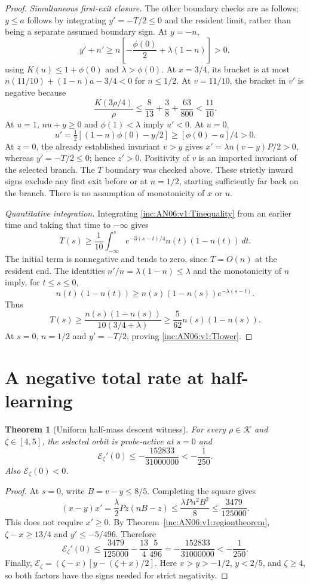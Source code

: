 \documentclass[11pt]{article}
\numberwithin{equation}{section}
\newtheorem{theorem}{Theorem}[section]
\theoremstyle{remark}\newtheorem{remark}[theorem]{Remark}
\newcommand{\1}{\mathbf 1}
\begin{document}
\begin{proof}
\emph{Simultaneous first-exit closure.}
The other boundary checks are as follows; $y\le a$ follows by integrating
$y'=-T/2\le0$ and the resident limit, rather than being a separate assumed
boundary sign.
At $y=-n$,
\[
 y'+n'\ge n\left[-\frac{\phi(0)}2+\lambda(1-n)\right]>0,
\]
using $K(u)\le1+\phi(0)$ and $\lambda>\phi(0)$.
At $x=3/4$, its bracket is at most
$n(11/10)+(1-n)a-3/4<0$ for $n\le1/2$.
At $v=11/10$, the bracket in $v'$ is negative because
\[
 \frac{K(3\rho/4)}\rho
 \le\frac{8}{13}+\frac38+\frac{63}{800}<\frac{11}{10}.
\]
At $u=1$, $nu+y\ge0$ and $\phi(1)<\lambda$ imply $u'<0$.
At $u=0$,
\[
 u'=\tfrac12[(1-n)\phi(0)-y/2]\ge[\phi(0)-a]/4>0.
\]
At $z=0$, the already established invariant $v>y$ gives
$x'=\lambda n(v-y)P/2>0$, whereas $y'=-T/2\le0$; hence $z'>0$.
Positivity of $v$ is an imported invariant of the selected branch.
The $T$ boundary was checked above. These strictly inward signs exclude
any first exit before or at $n=1/2$, starting sufficiently far back on the
branch. There is no assumption of monotonicity of $x$ or $u$.

\emph{Quantitative integration.}
Integrating \eqref{inc:AN06:v1:Tinequality} from an earlier time and taking
that time to $-\infty$ gives
\[
 T(s)\ge\frac1{10}\int_{-\infty}^s
 e^{-3(s-t)/4}n(t)(1-n(t))\,dt.
\]
The initial term is nonnegative and tends to zero, since $T=O(n)$ at the
resident end. The identities $n'/n=\lambda(1-n)\le\lambda$ and the
monotonicity of $n$ imply, for $t\le s\le0$,
\[
 n(t)(1-n(t))\ge n(s)(1-n(s))e^{-\lambda(s-t)}.
\]
Thus
\[
 T(s)\ge\frac{n(s)(1-n(s))}{10(3/4+\lambda)}
 \ge\frac5{62}n(s)(1-n(s)).
\]
At $s=0$, $n=1/2$ and $y'=-T/2$, proving
\eqref{inc:AN06:v1:Tlower}.
\end{proof}

\section{A negative total rate at half-learning}
\label{inc:AN06:v1:halfdescent}
\begin{theorem}[Uniform half-mass descent witness]
\label{inc:AN06:v1:halfdescenttheorem}
For every $\rho\in\mathcal K$ and $\zeta\in[4,5]$, the selected orbit is
probe-active at $s=0$ and
\begin{equation}\label{inc:AN06:v1:halfrate}
 \mathcal E_\zeta'(0)\le-\frac{152833}{31000000}<-\frac1{250}.
\end{equation}
Also $\mathcal E_\zeta(0)<0$.
\end{theorem}
\begin{proof}
At $s=0$, write $B=v-y\le8/5$. Completing the square gives
\[
 (x-y)x'=\frac\lambda2 Pz(nB-z)
 \le\frac{\lambda Pn^2B^2}{8}
 \le\frac{3479}{125000}.
\]
This does not require $x'\ge0$. By Theorem~\ref{inc:AN06:v1:regiontheorem},
$\zeta-x\ge13/4$ and $y'\le-5/496$. Therefore
\[
 \mathcal E_\zeta'(0)
 \le\frac{3479}{125000}-\frac{13}{4}\frac5{496}
 =-\frac{152833}{31000000}<-\frac1{250}.
\]
Finally,
$\mathcal E_\zeta=(\zeta-x)[y-(\zeta+x)/2]$.
Here $x>y>-1/2$, $y<2/5$, and $\zeta\ge4$, so both factors have the
signs needed for strict negativity.
\end{proof}
\end{document}

